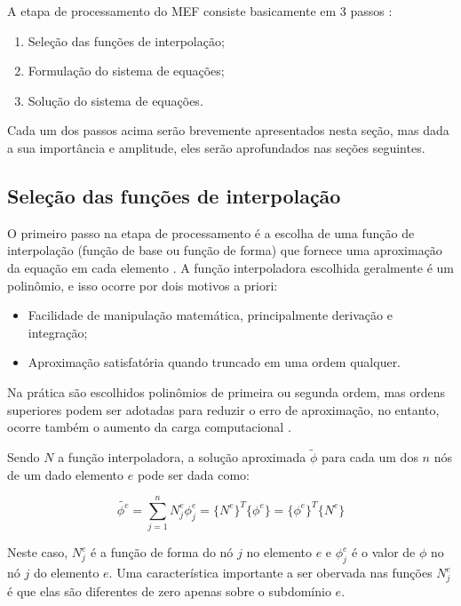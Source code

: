 \documentclass[
    12pt,               %
    openright,          %
    oneside,
    a4paper,            %
    english,            %
    french,             %
    spanish,            %
    brazil              %
    ]{abntex2}
\begin{document}
A etapa de processamento do MEF consiste basicamente em 3 passos \cite[p. 31]{jin}:

\begin{enumerate}  
\item Seleção das funções de interpolação;
\item Formulação do sistema de equações;
\item Solução do sistema de equações. 
\end{enumerate}

Cada um dos passos acima serão brevemente apresentados nesta seção, mas dada a sua importância e amplitude, eles serão aprofundados nas seções seguintes.

\subsection{Seleção das funções de interpolação}
O primeiro passo na etapa de processamento é a escolha de uma função de interpolação (função de base ou função de forma) \cite[p. 37]{volakis} que fornece uma aproximação da equação em cada elemento \cite[p. 32]{jin}. 
A função interpoladora escolhida geralmente é um polinômio, e isso ocorre por dois motivos a priori: \cite[p. 77]{desai}

\begin{itemize}  
\item Facilidade de manipulação matemática, principalmente derivação e integração;
\item Aproximação satisfatória quando truncado em uma ordem qualquer.
\end{itemize}

Na prática são escolhidos polinômios de primeira ou segunda ordem, mas ordens superiores podem ser adotadas para reduzir o erro de aproximação, no entanto, ocorre também o aumento da carga computacional \cite[p. 32]{jin}.

Sendo $N$ a função interpoladora, a solução aproximada $\tilde{\phi}$ para cada um dos $n$ nós de um dado elemento $e$ pode ser dada como:

 \begin{equation}
    \label{eq:interpol}
        \tilde{\phi^e} = \sum_{j=1}^{n}{N_j^e \phi_j^e} = 
        \{N^e\}^T \{\phi^e\} = \{\phi^e\}^T \{N^e\}
 \end{equation}

Neste caso, $N_j^e$ é a função de forma do nó $j$ no elemento $e$ e $\phi_j^e$ é o valor de $\phi$ no nó $j$ do elemento $e$.
Uma característica importante a ser obervada nas funções $N_j^e$ é que elas são diferentes de zero apenas sobre o subdomínio $e$.
\end{document}
